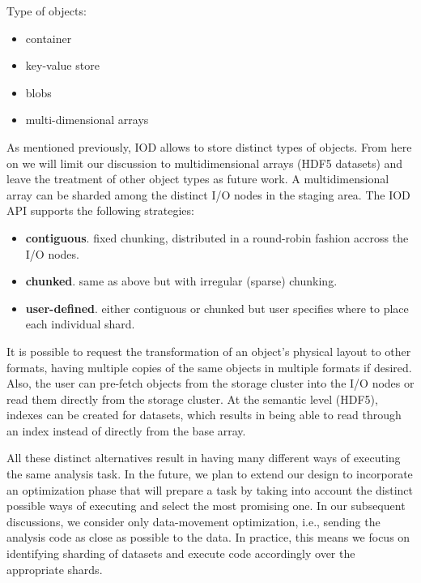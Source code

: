 \documentclass[conference]{IEEEtran}
\begin{document}
Type of objects:

\begin{itemize}
\itemsep1pt\parskip0pt
\item
  container
\item
  key-value store
\item
  blobs
\item
  multi-dimensional arrays
\end{itemize}

As mentioned previously, IOD allows to store distinct types of objects.
From here on we will limit our discussion to multidimensional arrays
(HDF5 datasets) and leave the treatment of other object types as future
work. A multidimensional array can be sharded among the distinct I/O
nodes in the staging area. The IOD API supports the following
strategies:

\begin{itemize}
\itemsep1pt\parskip0pt
\item
  \textbf{contiguous}. fixed chunking, distributed in a round-robin
  fashion accross the I/O nodes.
\item
  \textbf{chunked}. same as above but with irregular (sparse) chunking.
\item
  \textbf{user-defined}. either contiguous or chunked but user specifies
  where to place each individual shard.
\end{itemize}

It is possible to request the transformation of an object's physical
layout to other formats, having multiple copies of the same objects in
multiple formats if desired. Also, the user can pre-fetch objects from
the storage cluster into the I/O nodes or read them directly from the
storage cluster. At the semantic level (HDF5), indexes can be created
for datasets, which results in being able to read through an index
instead of directly from the base array.

All these distinct alternatives result in having many different ways of
executing the same analysis task. In the future, we plan to extend our
design to incorporate an optimization phase that will prepare a task by
taking into account the distinct possible ways of executing and select
the most promising one. In our subsequent discussions, we consider only
data-movement optimization, i.e., sending the analysis code as close as
possible to the data. In practice, this means we focus on identifying
sharding of datasets and execute code accordingly over the appropriate
shards.
\end{document}

